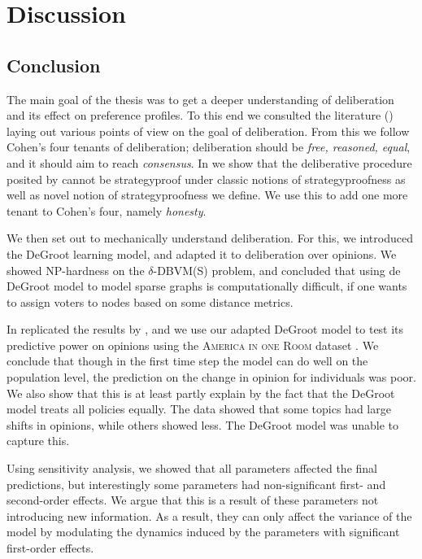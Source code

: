 \newpage
\chapter{Discussion}
\label{Discussion}

\section{Conclusion}

The main goal of the thesis was to get a deeper understanding of deliberation
and its effect on preference profiles. To this end we consulted the literature
() laying out various points of view on the goal of
deliberation. From this we follow Cohen's
\cite{cohenDeliberationDemocraticLegimitimacy2002} four tenants of
deliberation; deliberation should be \textit{free, reasoned, equal}, and  it
should aim to reach \textit{consensus}. In  we show that the
deliberative procedure posited by
\citet{radDeliberationSinglePeakednessCoherent2021} cannot be strategyproof
under classic notions of strategyproofness as well as novel notion of
strategyproofness we define. We use this to add one more tenant to Cohen's four,
namely \textit{honesty}.

We then set out to mechanically understand deliberation. For this, we introduced
the DeGroot learning model, and adapted it to deliberation over opinions. We showed
NP-hardness on the $\delta$-DBVM(S) problem, and concluded that using de DeGroot model
to model sparse graphs is computationally difficult, if one wants to assign voters to nodes
based on some distance metrics.

In  replicated the results by
\citet{radDeliberationSinglePeakednessCoherent2021}, and we use our adapted
DeGroot model to test its predictive power on opinions using the
\textsc{America in one Room} dataset \cite{fishkinCanDeliberationHave2024}. We
conclude that though in the first time step the model can do well on the
population level, the prediction on the change in opinion for individuals was
poor. We also show that this is at least partly explain by the fact that the
DeGroot model treats all policies equally. The data showed that some topics had
large shifts in opinions, while others showed less. The DeGroot model was
unable to capture this.

Using sensitivity analysis, we showed that all parameters affected the final
predictions, but interestingly some parameters had non-significant first- and second-order
effects. We argue that this is a result of these parameters not introducing new
information. As a result, they can only affect the variance of the model by
modulating the dynamics induced by the parameters with significant first-order
effects.

